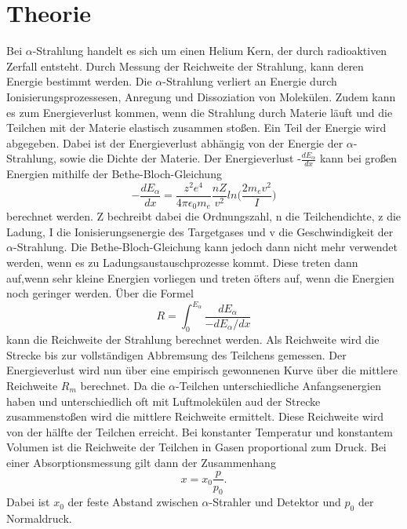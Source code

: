\section{Theorie}
\label{sec:Theorie}

Bei $\alpha$-Strahlung handelt es sich um einen Helium Kern, der durch radioaktiven Zerfall entsteht.
Durch Messung der Reichweite der Strahlung, kann deren Energie bestimmt werden.
Die $\alpha$-Strahlung verliert an Energie durch Ionisierungsprozessesen, Anregung und Dissoziation von Molekülen.
Zudem kann es zum Energieverlust kommen, wenn die Strahlung durch Materie läuft und die Teilchen mit der Materie elastisch zusammen stoßen.
Ein Teil der Energie wird abgegeben.
Dabei ist der Energieverlust abhängig von der Energie der $\alpha$-Strahlung, sowie die Dichte der Materie.
Der Energieverlust -$\frac{dE_\alpha}{dx}$ kann bei großen Energien mithilfe der Bethe-Bloch-Gleichung 
\begin{equation}
    -\frac{dE_\alpha}{dx} = \frac{z^2 e^4}{4 \pi \epsilon_0 m_e}
     \frac{n Z}{v^2}ln\biggl(\frac{2 m_e v^2}{I}\biggr)
\end{equation}
berechnet werden.
Z bechreibt dabei die Ordnungszahl, n die Teilchendichte, z die Ladung, I die Ionisierungsenergie des Targetgases und v die Geschwindigkeit der $\alpha$-Strahlung.
Die Bethe-Bloch-Gleichung kann jedoch dann nicht mehr verwendet werden, wenn es zu Ladungsaustauschprozesse kommt. 
Diese treten dann auf,wenn sehr kleine Energien vorliegen und treten öfters auf, wenn die Energien noch geringer werden.
Über die Formel
\begin{equation}
    R = \int_0^{E_\alpha} \frac{dE_\alpha}{-dE_\alpha /dx}
\end{equation}
kann die Reichweite der Strahlung berechnet werden. 
Als Reichweite wird die Strecke bis zur vollständigen Abbremsung des Teilchens gemessen.
Der Energieverlust wird nun über eine empirisch gewonnenen Kurve über die mittlere Reichweite $R_m$ berechnet.
Da die $\alpha$-Teilchen unterschiedliche Anfangsenergien haben und unterschiedlich oft mit Luftmolekülen aud der Strecke zusammenstoßen wird die 
mittlere Reichweite ermittelt. Diese Reichweite wird von der hälfte der Teilchen erreicht.
Bei konstanter Temperatur und konstantem Volumen ist die Reichweite der Teilchen in Gasen proportional zum Druck.
Bei einer Absorptionsmessung gilt dann der Zusammenhang
\begin{equation}
    x = x_0 \frac{p}{p_0}.
    \label{eq:ptox}
\end{equation} 
Dabei ist $x_0$ der feste Abstand zwischen $\alpha$-Strahler und Detektor und $p_0$ der Normaldruck.

\cite{V701}
 